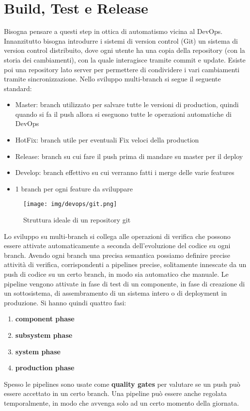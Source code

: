 \section{Build, Test e Release}
Bisogna pensare a questi step in ottica di automatismo vicina al DevOps.
Innanzitutto bisogna introdurre i sistemi di version control (Git) un sistema di
version control distribuito, dove ogni utente ha una copia della repository
(con la storia dei cambiamenti), con la quale interagisce tramite commit e update.
Esiste poi una repository lato server per permettere di condividere i vari
cambiamenti tramite sincronizzazione. Nello sviluppo multi-branch si segue il 
seguente standard:
\begin{itemize}
	\item Master: branch utilizzato per salvare tutte le versioni di production, 
      quindi quando si fa il push allora si eseguono tutte le operazioni 
      automatiche di DevOps
	\item HotFix: branch utile per eventuali Fix veloci della production
	\item Release: branch su cui fare il push prima di mandare su master per 
      il deploy
	\item Develop: branch effettivo su cui verranno fatti i merge delle 
      varie features
	\item 1 branch per ogni feature da sviluppare	
\end{itemize}

\begin{figure}[!ht]
      \centering
      \texttt{[image: img/devops/git.png]}
      \caption{Struttura ideale di un repository git}
      \label{fig:git}
\end{figure}
Lo sviluppo su multi-branch si collega alle operazioni di verifica che possono
essere attivate automaticamente a seconda dell'evoluzione del codice su ogni branch.
Avendo ogni branch una precisa semantica possiamo definire precise attività di
verifica, corrispondenti a pipelines precise, solitamente innescate da un push di
codice su un certo branch, in modo sia automatico che manuale.
Le pipeline vengono attivate in fase di test di un componente, in fase di creazione
di un sottosistema, di assembramento di un sistema intero o di deployment in
produzione. Si hanno quindi quattro fasi:
\begin{enumerate}
      \item \textbf{component phase}
      \item \textbf{subsystem phase}
      \item \textbf{system phase}
      \item \textbf{production phase}
\end{enumerate}
Spesso le pipelines sono usate come \textbf{quality gates} per valutare se un push
può essere accettato in un certo branch. Una pipeline può essere anche regolata
temporalmente, in modo che avvenga solo ad un certo momento della giornata.
